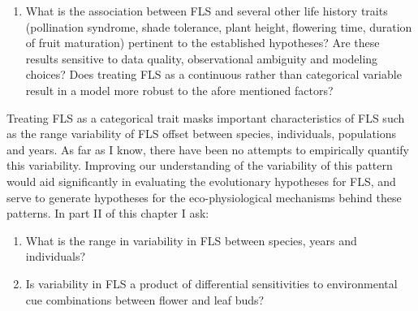 \documentclass{article}\usepackage[]{graphicx}\usepackage[]{color}
\begin{document}
\begin{enumerate}
\item  What is the association between FLS and several other life history traits (pollination syndrome, shade tolerance, plant height, flowering time, duration of fruit maturation) pertinent to the established hypotheses? Are these results sensitive to data quality, observational ambiguity and modeling choices? Does treating FLS as a continuous rather than categorical variable result in a model more robust to the afore mentioned factors?
\end{enumerate}
\indent\indent Treating FLS as a categorical trait masks important characteristics of FLS such as the range variability of FLS offset between species, individuals, populations and years. As far as I know, there have been no attempts to empirically quantify this variability. Improving our understanding of the variability of this pattern would aid significantly in evaluating the evolutionary hypotheses for FLS, and serve to generate hypotheses for the eco-physiological mechanisms behind these patterns. In part II of this chapter I ask:
\begin{enumerate}
\item What is the range in variability in FLS between species, years and individuals?
\item Is variability in FLS a product of differential sensitivities to environmental cue combinations between flower and leaf buds?
\end{enumerate}
\end{document}
